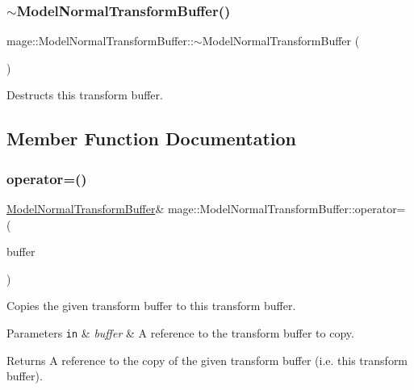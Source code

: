\subsubsection{\texorpdfstring{$\sim$\+Model\+Normal\+Transform\+Buffer()}{~ModelNormalTransformBuffer()}}
{\footnotesize\ttfamily mage\+::\+Model\+Normal\+Transform\+Buffer\+::$\sim$\+Model\+Normal\+Transform\+Buffer (\begin{DoxyParamCaption}{ }\end{DoxyParamCaption})\hspace{0.3cm}{\ttfamily [default]}}

Destructs this transform buffer. 

\subsection{Member Function Documentation}
\hypertarget{structmage_1_1_model_normal_transform_buffer_ae0b033dc93145a55e5e00024f8f95330}{}\label{structmage_1_1_model_normal_transform_buffer_ae0b033dc93145a55e5e00024f8f95330} 
\subsubsection{\texorpdfstring{operator=()}{operator=()}\hspace{0.1cm}{\footnotesize\ttfamily [1/2]}}
{\footnotesize\ttfamily \hyperlink{structmage_1_1_model_normal_transform_buffer}{Model\+Normal\+Transform\+Buffer}\& mage\+::\+Model\+Normal\+Transform\+Buffer\+::operator= (\begin{DoxyParamCaption}\item[{const \hyperlink{structmage_1_1_model_normal_transform_buffer}{Model\+Normal\+Transform\+Buffer} \&}]{buffer }\end{DoxyParamCaption})\hspace{0.3cm}{\ttfamily [default]}}

Copies the given transform buffer to this transform buffer.


\begin{DoxyParams}[1]{Parameters}
\mbox{\tt in}  & {\em buffer} & A reference to the transform buffer to copy. \\
\hline
\end{DoxyParams}
\begin{DoxyReturn}{Returns}
A reference to the copy of the given transform buffer (i.\+e. this transform buffer). 
\end{DoxyReturn}
\hypertarget{structmage_1_1_model_normal_transform_buffer_acc27af2e1e65994a43e1d804aa25bb5a}{}\label{structmage_1_1_model_normal_transform_buffer_acc27af2e1e65994a43e1d804aa25bb5a} 
